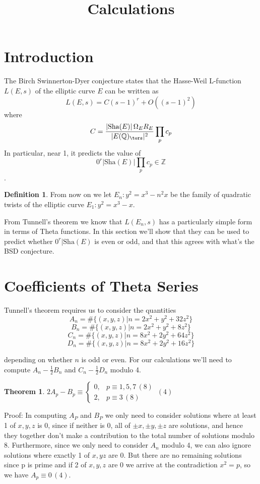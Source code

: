 \documentclass[11pt,a4paper]{amsart}
\title[Latex Template]{Calculations}
\theoremstyle{plain}
\newtheorem{thm}[prop]{Theorem}
\theoremstyle{definition}
\newtheorem{defn}[prop]{Definition}
\theoremstyle{remark}
\numberwithin{equation}{section}
\newcommand{\ZZ}{{\mathbb Z}}
\newcommand{\QQ}{{\mathbb Q}}
\newcommand{\1}{{\mathds 1}}
\begin{document}
\maketitle

\section{Introduction}

The Birch Swinnerton-Dyer conjecture states that the Hasse-Weil L-function
$L(E,s)$ of the elliptic curve $E$ can be written as
\[L(E,s) = C (s-1)^r + O((s-1)^2)\] where
\[C = \frac{|\text{Sha}(E)| \, \Omega_E R_E}{|E(\QQ)_{\tors}|^2} \prod_p c_p\]
In particular, near 1, it predicts the value of
\[0^r |\text{Sha}(E)| \prod_p c_p \in \ZZ\].

\begin{defn}
  From now on we let $E_n : y^2 = x^3 - n^2x$
  be the family of quadratic twists of the elliptic
  curve $E_1 : y^2 = x^3 - x$.
\end{defn}

From Tunnell's theorem we know that $L(E_n,s)$ has a particularly simple
form in terms of Theta functions. In this section we'll show that they
can be used to predict whether $0^r |\text{Sha}(E)$ is even or odd, and that
this agrees with what's the BSD conjecture.


\section{Coefficients of Theta Series}
Tunnell's theorem requires us to consider the quantities 
\[  A_n = \#\{(x,y,z) | n = 2x^2 + y^2 + 32z^2\} \]
\[  B_n = \#\{(x,y,z) | n = 2x^2 + y^2 + 8z^2\} \]
\[  C_n = \#\{(x,y,z) | n = 8x^2 + 2y^2 + 64z^2\} \]
\[  D_n = \#\{(x,y,z) | n = 8x^2 + 2y^2 + 16z^2\} \]

depending on whether $n$ is odd or even. For our calculations we'll
need to compute $A_n - \frac{1}{2}B_n$ and $C_n - \frac{1}{2}D_n$ modulo 4.

\begin{thm}
  $2A_p - B_p \equiv \begin{cases} 0, & p \equiv 1, 5, 7 \, (8) \\
    2, & p \equiv 3 \, (8) \end{cases}
  \, (4)$
\end{thm}
Proof: In computing $A_P$ and $B_P$ we only need to consider solutions
where at least 1 of $x, y, z$ is 0, since if neither is 0, all of $\pm x, \pm y, \pm z$
are solutions, and hence they together don't make a contribution to the total
number of solutions modulo 8. Furthermore, since we only need to consider $A_n$
modulo 4, we can also ignore solutions where exactly 1 of $x, y z$ are 0. But
there are no remaining solutions since p is prime and if 2 of $x, y, z$ are 0 we
arrive at the contradiction $x^2 = p$, so we have $A_p \equiv 0 \, (4)$.
\end{document}

